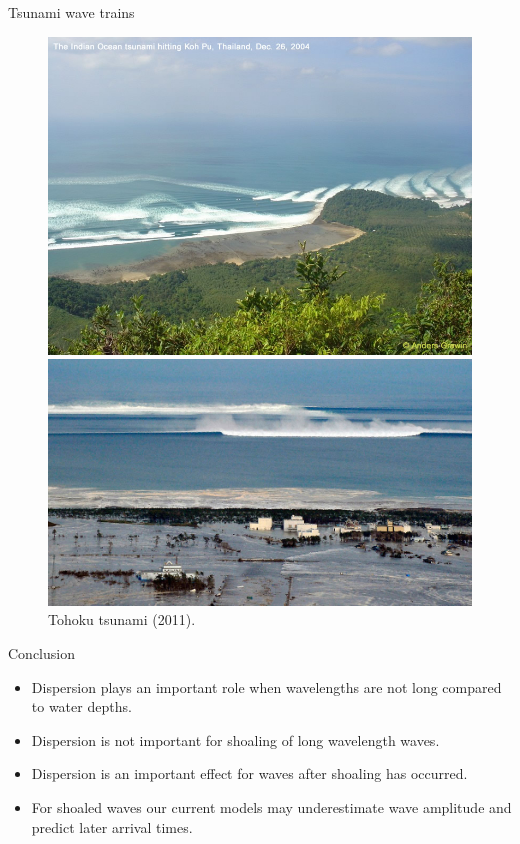 \documentclass[pdf]{beamer}
\begin{document}
\begin{frame}{Tsunami wave trains}
		\begin{figure}
			\centering
		\begin{minipage}{.45\textwidth}
			\vspace{0.4cm}
			\centering
			\includegraphics[width=0.9\linewidth]{./Pics/sumatra_tsunami.jpg}
			\caption{Indian ocean tsunami (2004).}
		\end{minipage}%
		\begin{minipage}{.58\textwidth}
			\centering
			\includegraphics[width=0.9\linewidth]{./Pics/1327.jpg}
			\caption{Tohoku tsunami (2011).}
		\end{minipage}
	\end{figure}
\end{frame}

\begin{frame}{Conclusion}
\begin{itemize}
	\item Dispersion plays an important role when wavelengths are not long compared to water depths.
	\item Dispersion is not important for shoaling of long wavelength waves.
	\item Dispersion is an important effect for waves after shoaling has occurred. 
	\item For shoaled waves our current models may underestimate wave amplitude and predict later arrival times.
\end{itemize}
\end{frame}
\end{document}
